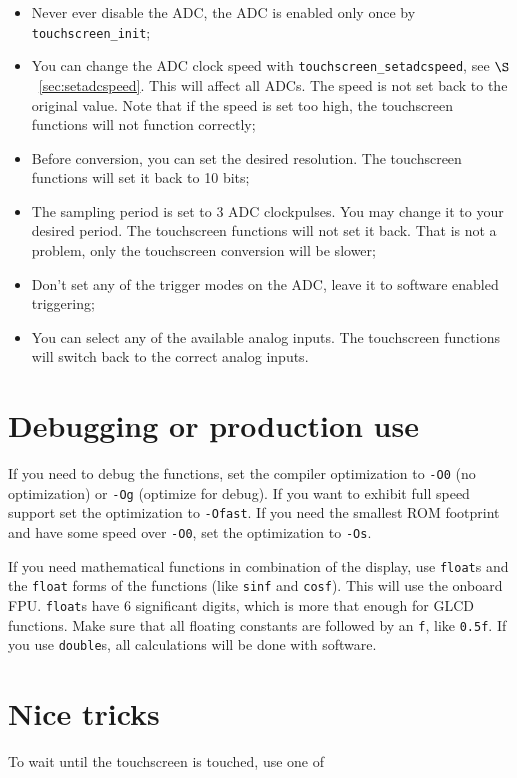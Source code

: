 \documentclass[12pt]{article}
\begin{document}
\begin{itemize}
\item Never ever disable the ADC, the ADC is enabled only once by \lstinline|touchscreen_init|;
\item You can change the ADC clock speed with \lstinline|touchscreen_setadcspeed|, see $\S$~\ref{sec:setadcspeed}. This will affect all ADCs. The speed is not set back to the original value. Note that if the speed is set too high, the touchscreen functions will not function correctly;
\item Before conversion, you can set the desired resolution. The touchscreen functions will set it back to 10 bits;
\item The sampling period is set to 3 ADC clockpulses. You may change it to your desired period. The touchscreen functions will not set it back. That is not a problem, only the touchscreen conversion will be slower;
\item Don't set any of the trigger modes on the ADC, leave it to software enabled triggering;
\item You can select any of the available analog inputs. The touchscreen functions will switch back to the correct analog inputs. 
\end{itemize}


\section{Debugging or production use}
If you need to debug the functions, set the compiler optimization to \lstinline|-O0| (no optimization) or \lstinline|-Og| (optimize for debug). If you want to exhibit full speed support set the optimization to \lstinline|-Ofast|. If you need the smallest ROM footprint and have some speed over \lstinline|-O0|, set the optimization to \lstinline|-Os|.

If you need mathematical functions in combination of the display, use \lstinline|float|s and the \lstinline|float| forms of the functions (like \lstinline|sinf| and \lstinline|cosf|). This will use the onboard FPU. \lstinline|float|s have 6 significant digits, which is more that enough for GLCD functions. Make sure that all floating constants are followed by an \lstinline|f|, like \lstinline|0.5f|. If you use \lstinline|double|s, all calculations will be done with software.

\section{Nice tricks}
To wait until the touchscreen is touched, use one of
\end{document}
